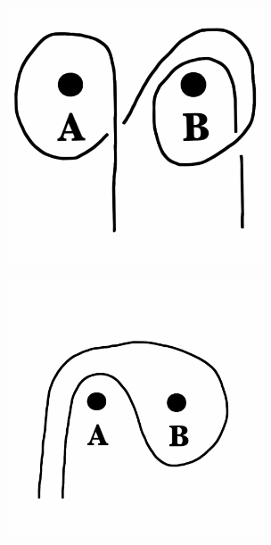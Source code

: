 \documentclass[12pt,letterpaper]{article}
\theoremstyle{definition}
\begin{document}
\begin{figure}[h]
    \includegraphics[height=3in]{phppics/AsBB.png}
\end{figure}

\begin{figure}[h]
    \includegraphics[height=3in]{phppics/ABAs.png}
\end{figure}
\end{document}
